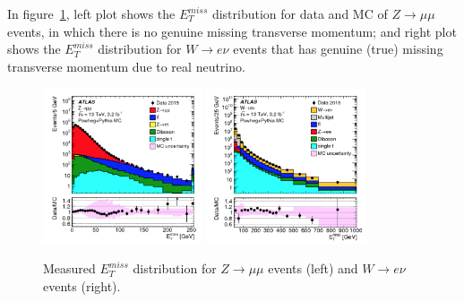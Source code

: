 In figure~\ref{fig:met_dis}, left plot shows the $E_{T}^{miss}$ distribution for data and MC of $Z \rightarrow \mu\mu$ events, in which there is no genuine missing transverse momentum;
and right plot shows the $E_{T}^{miss}$ distribution for $W \rightarrow e\nu$ events that has genuine (true) missing transverse momentum due to real neutrino.
\begin{figure}[!htb]
  \centering
  \includegraphics[width=0.42\textwidth]{figures/Simulation/met_Zmm.png}
  \includegraphics[width=0.42\textwidth]{figures/Simulation/met_Wev.png}
  \caption{Measured $E_{T}^{miss}$ distribution for $Z \rightarrow \mu\mu$ events (left) and $W \rightarrow e\nu$ events (right). }
  \label{fig:met_dis}
\end{figure}
